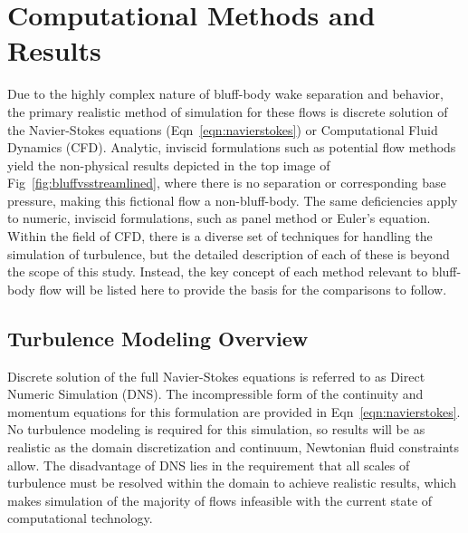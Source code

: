 \documentclass[journal]{new-aiaa}
\begin{document}

























\clearpage

\section{Computational Methods and Results} \label{sec:computationalmethods}

Due to the highly complex nature of bluff-body wake separation and behavior, the primary realistic method of simulation for these flows is discrete solution of the Navier-Stokes equations (Eqn~\ref{eqn:navierstokes}) or Computational Fluid Dynamics (CFD). Analytic, inviscid formulations such as potential flow methods yield the non-physical results depicted in the top image of Fig~\ref{fig:bluffvsstreamlined}, where there is no separation or corresponding base pressure, making this fictional flow a non-bluff-body. The same deficiencies apply to numeric, inviscid formulations, such as panel method or Euler's equation. Within the field of CFD, there is a diverse set of techniques for handling the simulation of turbulence, but the detailed description of each of these is beyond the scope of this study. Instead, the key concept of each method relevant to bluff-body flow will be listed here to provide the basis for the comparisons to follow.


\subsection{Turbulence Modeling Overview} \label{subsec:turbulencemodeling}

 Discrete solution of the full Navier-Stokes equations is referred to as Direct Numeric Simulation (DNS). The incompressible form of the continuity and momentum equations for this formulation are provided in Eqn~\ref{eqn:navierstokes}. No turbulence modeling is required for this simulation, so results will be as realistic as the domain discretization and continuum, Newtonian fluid constraints allow. The disadvantage of DNS lies in the requirement that all scales of turbulence must be resolved within the domain to achieve realistic results, which makes simulation of the majority of flows infeasible with the current state of computational technology.
\end{document}
